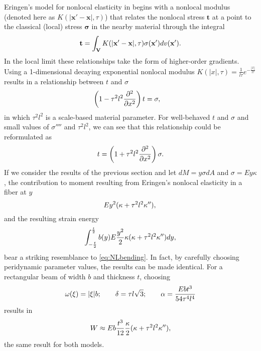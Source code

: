 \documentclass[preprint,review,12pt]{elsarticle}
\begin{document}
Eringen's model for nonlocal elasticity in \cite{eringen1983differential} begins with a nonlocal modulus (denoted here as \(K(|\mathbf{x}'-\mathbf{x}|,\tau)\)) that relates the nonlocal stress \(\mathbf{t}\) at a point to the classical (local) stress \(\boldsymbol{\sigma}\) in the nearby material through the integral
\begin{equation}
\mathbf{t} = \int_\mathbf{V} K(|\mathbf{x}'-\mathbf{x}|,\tau)\sigma(\mathbf{x}')dv(\mathbf{x}').\notag
\end{equation}
In the local limit these relationships take the form of higher-order gradients.
Using a 1-dimensional decaying exponential nonlocal modulus \(K(|x|,\tau)=\frac{1}{l\tau}e^{-\frac{|x|}{l\tau}}\)results in a relationship between \(t\) and \(\sigma\) 
\begin{align}
\left(1-\tau^2l^2\frac{\partial^2}{\partial x^2}\right)t&=\sigma,\notag
\end{align}
in which \(\tau^2l^2\) is a scale-based material parameter.
For well-behaved \(t\) and \(\sigma\) and small values of \(\sigma''''\) and \(\tau^2l^2\), we can see that this relationship could be reformulated as
\begin{equation}
\label{eq:NLstress}
t=\left(1+\tau^2l^2\frac{\partial^2}{\partial x^2}\right)\sigma.\notag
\end{equation}
If we consider the results of the previous section and let \(dM = y\sigma dA\) and \(\sigma = Ey\kappa\), the contribution to moment resulting from Eringen's nonlocal elasticity in a fiber at \(y\)
\begin{equation}
\label{eq:EringenMoment}
E y^2 (\kappa+\tau^2l^2\kappa''), \\
\end{equation}
and the resulting strain energy
\begin{equation}
\label{eq:EringenEnergy}
\int_{-\frac{t}{2}}^{\frac{t}{2}} b(y) E \frac{y^2}{2} \kappa (\kappa+\tau^2l^2\kappa'')  dy,\notag
\end{equation}
bear a striking resemblance to \cref{eq:NLbending}.
In fact, by carefully choosing peridynamic parameter values, the results can be made identical.
For a rectangular beam of width \(b\) and thickness \(t\), choosing 
\begin{equation}
\omega(\xi) = |\xi|b ;\qquad \delta = \tau l \sqrt{3} ;\qquad \alpha = \frac{E b t^3}{54 \tau^4 l^4}\notag
\end{equation}
results in
\begin{equation}
W \approx E b \frac{t^3}{12} \frac{\kappa}{2}(\kappa+\tau^2 l^2 \kappa''), \notag
\end{equation}
the same result for both models.
\end{document}
